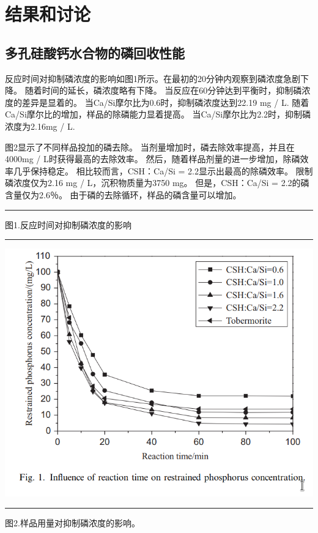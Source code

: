 \documentclass[11pt]{article}
\begin{document}
\section{结果和讨论}
\label{sec:org4e54e98}
\subsection{多孔硅酸钙水合物的磷回收性能}
\label{sec:org0755e36}
反应时间对抑制磷浓度的影响如图1所示。在最初的20分钟内观察到磷浓度急剧下降。 随着时间的延长，磷浓度略有下降。 当反应在60分钟达到平衡时，抑制磷浓度的差异是显着的。 当Ca/Si摩尔比为0.6时，抑制磷浓度达到22.19 mg / L. 随着Ca/Si摩尔比的增加，样品的除磷能力显着提高。 当Ca/Si摩尔比为2.2时，抑制磷浓度为2.16mg / L.

图2显示了不同样品投加的磷去除。 当剂量增加时，磷去除效率提高，并且在4000mg / L时获得最高的去除效率。 然后，随着样品剂量的进一步增加，除磷效率几乎保持稳定。 相比较而言，CSH：Ca/Si = 2.2显示出最高的除磷效率。 限制磷浓度仅为2.16 mg / L，沉积物质量为3750 mg。 但是，CSH：Ca/Si = 2.2的磷含量仅为2.6％。 由于磷的去除循环，样品的磷含量可以增加。

\noindent\rule{\textwidth}{0.5pt}
图1.反应时间对抑制磷浓度的影响

\noindent\rule{\textwidth}{0.5pt}
\includegraphics[scale=0.3]{fig.1.png}

\noindent\rule{\textwidth}{0.5pt}
图2.样品用量对抑制磷浓度的影响。
\end{document}
